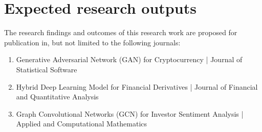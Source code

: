 \documentclass[a4paper,11pt]{scrartcl}
\begin{document}
\section{Expected research outputs}
The research findings and outcomes of this research work are proposed for publication in, but not limited to the following journals:
\begin{enumerate}
    \item Generative Adversarial Network (GAN) for Cryptocurrency | Journal of Statistical Software
    \item Hybrid Deep Learning Model for Financial Derivatives | Journal of Financial and Quantitative Analysis
    \item Graph Convolutional Networks (GCN) for Investor Sentiment Analysis | Applied and Computational Mathematics
\end{enumerate}



\end{document}
